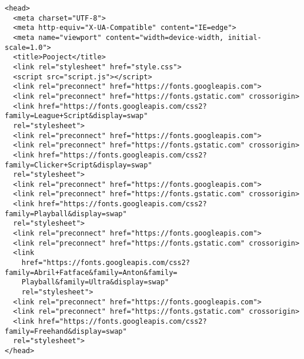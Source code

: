 \documentclass{article}
\begin{document}
\begin{flushleft}
\begin{enumerate}
\begin{verbatim}
<head>
  <meta charset="UTF-8">
  <meta http-equiv="X-UA-Compatible" content="IE=edge">
  <meta name="viewport" content="width=device-width, initial-scale=1.0">
  <title>Pooject</title>
  <link rel="stylesheet" href="style.css">
  <script src="script.js"></script>
  <link rel="preconnect" href="https://fonts.googleapis.com">
  <link rel="preconnect" href="https://fonts.gstatic.com" crossorigin>
  <link href="https://fonts.googleapis.com/css2?family=League+Script&display=swap" 
  rel="stylesheet">
  <link rel="preconnect" href="https://fonts.googleapis.com">
  <link rel="preconnect" href="https://fonts.gstatic.com" crossorigin>
  <link href="https://fonts.googleapis.com/css2?family=Clicker+Script&display=swap" 
  rel="stylesheet">
  <link rel="preconnect" href="https://fonts.googleapis.com">
  <link rel="preconnect" href="https://fonts.gstatic.com" crossorigin>
  <link href="https://fonts.googleapis.com/css2?family=Playball&display=swap" 
  rel="stylesheet">
  <link rel="preconnect" href="https://fonts.googleapis.com">
  <link rel="preconnect" href="https://fonts.gstatic.com" crossorigin>
  <link
    href="https://fonts.googleapis.com/css2?family=Abril+Fatface&family=Anton&family=
    Playball&family=Ultra&display=swap"
    rel="stylesheet">
  <link rel="preconnect" href="https://fonts.googleapis.com">
  <link rel="preconnect" href="https://fonts.gstatic.com" crossorigin>
  <link href="https://fonts.googleapis.com/css2?family=Freehand&display=swap" 
  rel="stylesheet">
</head>


\end{verbatim}
\end{enumerate}
\end{flushleft}
\end{document}
